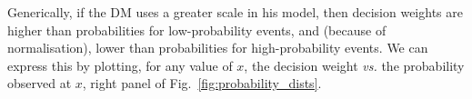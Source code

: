 \documentclass[a4paper, 12pt]{article}
\newcommand{\flabel}[1]{\label{fig:#1}}
\newcommand{\fref}[1]{Fig.~\ref{fig:#1}}
\newcommand{\Secref}[1]{Section~\ref{sec:#1}}
\newcommand{\ND}{\mathcal{N}} %
\begin{document}
%
%
%

Generically, if the DM uses a greater scale in his model, then decision weights are higher than probabilities for low-probability events, and (because of normalisation), lower than probabilities for high-probability events. We can express this by plotting, for any value of $x$, the decision weight {\it vs.} the probability observed at $x$, right panel of \fref{probability_dists}.

\end{document}
